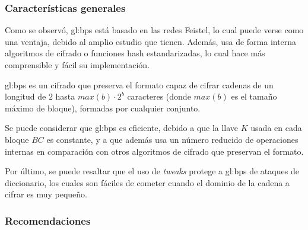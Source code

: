 \subsubsection{Características generales}



Como se observó, \gls{gl:bps} está basado en las redes Feistel, lo cual puede
verse como una ventaja, debido al amplio estudio que tienen. Además, usa de
forma interna algoritmos de cifrado o funciones hash estandarizadas, lo
cual hace más comprensible y fácil su implementación.

\Gls{gl:bps} es un cifrado que preserva el formato capaz de cifrar cadenas de
un longitud de $2$ hasta $max(b) \cdot 2^{b}$ caracteres (donde $max(b)$ es el
tamaño máximo de bloque), formadas por cualquier conjunto.

Se puede considerar que \gls{gl:bps} es eficiente, debido a que la llave $K$
usada en cada bloque $BC$ es constante, y a que además usa un número reducido
de operaciones internas en comparación con otros algoritmos de cifrado que
preservan el formato.

Por último, se puede resaltar que el uso de \textit{tweaks} protege a
\gls{gl:bps} de ataques de diccionario, los cuales son fáciles de cometer cuando
el dominio de la cadena a cifrar es muy pequeño.


\subsubsection{Recomendaciones}

